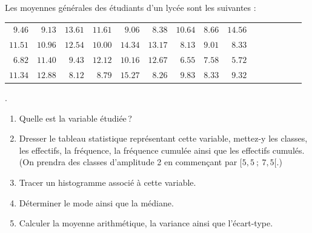       \begin{exo}
            \label{exo:stat4}
            Les moyennes g\'en\'erales des \'etudiants d'un lyc\'ee sont les suivantes : \newline
            \begin{tabular}[b]{rrrrrrrrrrrrrrr}
                  $9.46$ & $9.13$ & $13.61$ & $11.61$ & $9.06$ & $8.38$ & $10.64$ & $8.66$ & $14.56$ \\
                  $11.51$ & $10.96$ & $12.54$ & $10.00$ & $14.34$ & $13.17$ & $8.13$ & $9.01$ & $8.33$ \\
                  $6.82$ & $11.40$ & $9.43$ & $12.12$ & $10.16$ & $12.67$ & $6.55$ & $7.58$ & $5.72$ \\
                  $11.34$ & $12.88$ & $8.12$ & $8.79$ & $15.27$ & $8.26$ & $9.83$ & $8.33$ & $9.32$ \\
            \end{tabular}.
            \begin{enumerate}
	                  \item Quelle est la variable \'etudi\'ee\,?
                  \item Dresser le tableau statistique repr\'esentant cette variable,
                        mettez-y les classes, les effectifs, la fr\'equence, la fr\'equence cumul\'ee ainsi que les effectifs cumul\'es.
                        (On prendra des classes d'amplitude 2 en commen\c{c}ant par $[5,5 \ ; \ 7,5[$.)
                  \item Tracer un histogramme associ\'e \`a cette variable.
                  \item D\'eterminer le mode ainsi que la m\'ediane.
                  \item Calculer la moyenne arithm\'etique, la variance ainsi que l'\'ecart-type.
            \end{enumerate}
      \end{exo}
